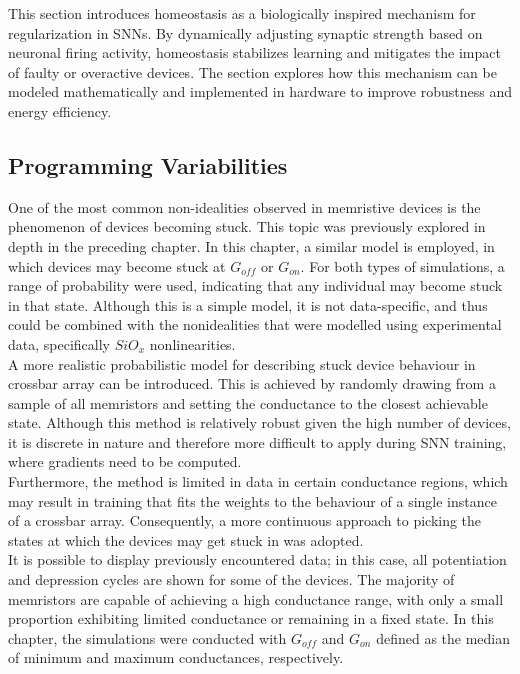 This section introduces homeostasis as a biologically inspired mechanism for regularization in SNNs. By dynamically adjusting synaptic strength based on neuronal firing activity, homeostasis stabilizes learning and mitigates the impact of faulty or overactive devices. The section explores how this mechanism can be modeled mathematically and implemented in hardware to improve robustness and energy efficiency.

\subsection{Programming Variabilities}

One of the most common non-idealities observed in memristive devices is the phenomenon of devices becoming stuck. This topic was previously explored in depth in the preceding chapter. In this chapter, a similar model is employed, in which devices may become stuck at $G_{off}$ or $G_{on}$. For both types of simulations, a range of probability were used, indicating that any individual may become stuck in that state. Although this is a simple model, it is not data-specific, and thus could be combined with the nonidealities that were modelled using experimental data, specifically $SiO_x$ nonlinearities.\\

\noindent A more realistic probabilistic model for describing stuck device behaviour in crossbar array can be introduced. This is achieved by randomly drawing from a sample of all memristors and setting the conductance to the closest achievable state. Although this method is relatively robust given the high number of devices, it is discrete in nature and therefore more difficult to apply during SNN training, where gradients need to be computed. \\

\noindent Furthermore, the method is limited in data in certain conductance regions, which may result in training that fits the weights to the behaviour of a single instance of a crossbar array. Consequently, a more continuous approach to picking the states at which the devices may get stuck in was adopted.\\

\noindent It is possible to display previously encountered data; in this case, all potentiation and depression cycles are shown for some of the devices. The majority of memristors are capable of achieving a high conductance range, with only a small proportion exhibiting limited conductance or remaining in a fixed state. In this chapter, the simulations were conducted with $G_{off}$ and $G_{on}$ defined as the median of minimum and maximum conductances, respectively. \\

